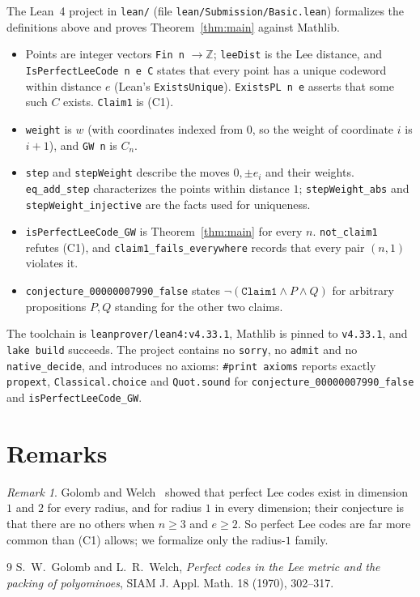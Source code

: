 \documentclass[11pt]{article}
\theoremstyle{plain}
\theoremstyle{definition}
\theoremstyle{remark}
\newtheorem{remark}[theorem]{Remark}
\newcommand{\Z}{\mathbb Z}
\begin{document}
\sloppy
The Lean~4 project in \texttt{lean/} (file \texttt{lean/Submission/Basic.lean})
formalizes the definitions above and proves Theorem~\ref{thm:main} against Mathlib.
\begin{itemize}
  \item Points are integer vectors \texttt{Fin n} $\to\Z$; \texttt{leeDist} is the
    Lee distance, and \texttt{IsPerfectLeeCode n e C} states that every point has a
    unique codeword within distance $e$ (Lean's \texttt{ExistsUnique}). \texttt{ExistsPL n e} asserts that some such
    $C$ exists. \texttt{Claim1} is (C1).
  \item \texttt{weight} is $w$ (with coordinates indexed from $0$, so the weight of
    coordinate $i$ is $i+1$), and \texttt{GW n} is $C_n$.
  \item \texttt{step} and \texttt{stepWeight} describe the moves $0,\pm e_i$ and
    their weights. \texttt{eq\_add\_step} characterizes the points within distance
    $1$; \texttt{stepWeight\_abs} and \texttt{stepWeight\_injective} are the facts used
    for uniqueness.
  \item \texttt{isPerfectLeeCode\_GW} is Theorem~\ref{thm:main} for every $n$.
    \texttt{not\_claim1} refutes (C1), and \texttt{claim1\_fails\_everywhere} records
    that every pair $(n,1)$ violates it.
  \item \texttt{conjecture\_00000007990\_false} states
    $\lnot(\texttt{Claim1}\wedge P\wedge Q)$ for arbitrary propositions $P,Q$ standing
    for the other two claims.
\end{itemize}
The toolchain is \texttt{leanprover/lean4:v4.33.1}, Mathlib is pinned to
\texttt{v4.33.1}, and \texttt{lake build} succeeds. The project contains no
\texttt{sorry}, no \texttt{admit} and no \texttt{native\_decide}, and introduces no
axioms: \texttt{\#print axioms} reports exactly \texttt{propext},
\texttt{Classical.choice} and \texttt{Quot.sound} for
\texttt{conjecture\_00000007990\_false} and \texttt{isPerfectLeeCode\_GW}.

\fussy
\section{Remarks}

\begin{remark}
Golomb and Welch~\cite{gw} showed that perfect Lee codes exist in dimension $1$ and
$2$ for every radius, and for radius $1$ in every dimension; their conjecture is that
there are no others when $n\ge3$ and $e\ge2$. So perfect Lee codes are far more
common than (C1) allows; we formalize only the radius-$1$ family.
\end{remark}

\begin{thebibliography}{9}
 S.~W.~Golomb and L.~R.~Welch, \emph{Perfect codes in the Lee metric and
  the packing of polyominoes}, SIAM J. Appl. Math. 18 (1970), 302--317.
\end{thebibliography}
\end{document}
